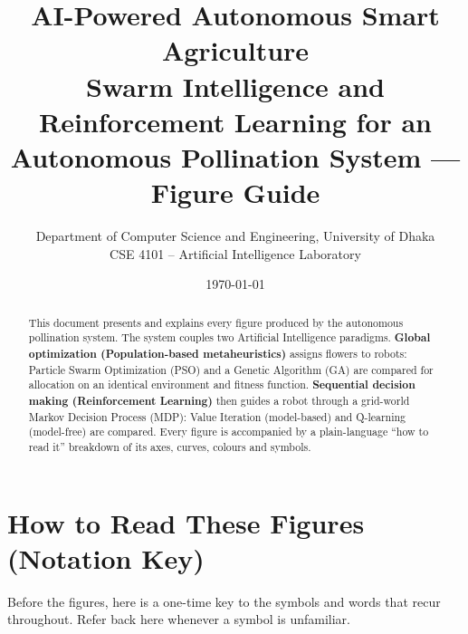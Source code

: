 \documentclass[11pt]{article}
\title{\textbf{AI-Powered Autonomous Smart Agriculture}\\[4pt]
\large Swarm Intelligence and Reinforcement Learning for an\\
Autonomous Pollination System --- Figure Guide}
\author{Department of Computer Science and Engineering, University of Dhaka\\
CSE 4101 -- Artificial Intelligence Laboratory}
\date{\today}
\begin{document}
\maketitle

\begin{abstract}
This document presents and explains every figure produced by the
autonomous pollination system. The system couples two Artificial
Intelligence paradigms. \textbf{Global optimization (Population-based
metaheuristics)} assigns flowers to robots: Particle Swarm Optimization (PSO)
and a Genetic Algorithm (GA) are compared for allocation on an identical
environment and fitness function.
\textbf{Sequential decision making (Reinforcement Learning)} then guides a
robot through a grid-world Markov Decision Process (MDP): Value Iteration
(model-based) and Q-learning (model-free) are compared. Every figure is
accompanied by a plain-language ``how to read it'' breakdown of its axes,
curves, colours and symbols.
\end{abstract}

\tableofcontents
\newpage

\section{How to Read These Figures (Notation Key)}
Before the figures, here is a one-time key to the symbols and words that
recur throughout. Refer back here whenever a symbol is unfamiliar.
\end{document}
